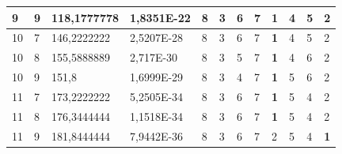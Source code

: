 \documentclass[conference]{IEEEtran}
\begin{document}
\begin{table}[]
\begin{tabular}{|llll|llllllll|}
		\multicolumn{1}{|l|}{9}   & \multicolumn{1}{l|}{9}         & \multicolumn{1}{l|}{118,1777778}   & 1,8351E-22 & \multicolumn{1}{l|}{8}   & \multicolumn{1}{l|}{3}   & \multicolumn{1}{l|}{6}   & \multicolumn{1}{l|}{7}   & \multicolumn{1}{l|}{\textbf{1}} & \multicolumn{1}{l|}{4}   & \multicolumn{1}{l|}{5}   & 2                      \\ \hline
		\multicolumn{1}{|l|}{10}  & \multicolumn{1}{l|}{7}         & \multicolumn{1}{l|}{146,2222222}   & 2,5207E-28 & \multicolumn{1}{l|}{8}   & \multicolumn{1}{l|}{3}   & \multicolumn{1}{l|}{6}   & \multicolumn{1}{l|}{7}   & \multicolumn{1}{l|}{\textbf{1}} & \multicolumn{1}{l|}{4}   & \multicolumn{1}{l|}{5}   & 2                      \\ \hline
		\multicolumn{1}{|l|}{10}  & \multicolumn{1}{l|}{8}         & \multicolumn{1}{l|}{155,5888889}   & 2,717E-30  & \multicolumn{1}{l|}{8}   & \multicolumn{1}{l|}{3}   & \multicolumn{1}{l|}{5}   & \multicolumn{1}{l|}{7}   & \multicolumn{1}{l|}{\textbf{1}} & \multicolumn{1}{l|}{4}   & \multicolumn{1}{l|}{6}   & 2                      \\ \hline
		\multicolumn{1}{|l|}{10}  & \multicolumn{1}{l|}{9}         & \multicolumn{1}{l|}{151,8}         & 1,6999E-29 & \multicolumn{1}{l|}{8}   & \multicolumn{1}{l|}{3}   & \multicolumn{1}{l|}{4}   & \multicolumn{1}{l|}{7}   & \multicolumn{1}{l|}{\textbf{1}} & \multicolumn{1}{l|}{5}   & \multicolumn{1}{l|}{6}   & 2                      \\ \hline
		\multicolumn{1}{|l|}{11}  & \multicolumn{1}{l|}{7}         & \multicolumn{1}{l|}{173,2222222}   & 5,2505E-34 & \multicolumn{1}{l|}{8}   & \multicolumn{1}{l|}{3}   & \multicolumn{1}{l|}{6}   & \multicolumn{1}{l|}{7}   & \multicolumn{1}{l|}{\textbf{1}} & \multicolumn{1}{l|}{5}   & \multicolumn{1}{l|}{4}   & 2                      \\ \hline
		\multicolumn{1}{|l|}{11}  & \multicolumn{1}{l|}{8}         & \multicolumn{1}{l|}{176,3444444}   & 1,1518E-34 & \multicolumn{1}{l|}{8}   & \multicolumn{1}{l|}{3}   & \multicolumn{1}{l|}{6}   & \multicolumn{1}{l|}{7}   & \multicolumn{1}{l|}{\textbf{1}} & \multicolumn{1}{l|}{5}   & \multicolumn{1}{l|}{4}   & 2                      \\ \hline
		\multicolumn{1}{|l|}{11}  & \multicolumn{1}{l|}{9}         & \multicolumn{1}{l|}{181,8444444}   & 7,9442E-36 & \multicolumn{1}{l|}{8}   & \multicolumn{1}{l|}{3}   & \multicolumn{1}{l|}{6}   & \multicolumn{1}{l|}{7}   & \multicolumn{1}{l|}{2}          & \multicolumn{1}{l|}{5}   & \multicolumn{1}{l|}{4}   & \textbf{1}             \\ \hline

\end{tabular}
\end{table}
\end{document}
